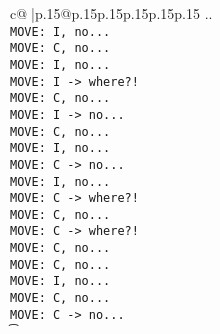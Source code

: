 \documentclass{article}
\begin{document}
{\begin{supertabular}{c@{$\;$}|p{.15\linewidth}@{}p{.15\linewidth}p{.15\linewidth}p{.15\linewidth}p{.15\linewidth}p{.15\linewidth}}
{{{..\\ \tt  MOVE: I, no...\\ \tt  MOVE: C, no...\\ \tt  MOVE: I, no...\\ \tt  MOVE: I -> where?!\\ \tt  MOVE: C, no...\\ \tt  MOVE: I -> no...\\ \tt  MOVE: C, no...\\ \tt  MOVE: I, no...\\ \tt  MOVE: C -> no...\\ \tt  MOVE: I, no...\\ \tt  MOVE: C -> where?!\\ \tt  MOVE: C, no...\\ \tt  MOVE: C -> where?!\\ \tt  MOVE: C, no...\\ \tt  MOVE: C, no...\\ \tt  MOVE: I, no...\\ \tt  MOVE: C, no...\\ \tt  MOVE: C -> no...\\ \t}}}
\end{supertabular}}
\end{document}
